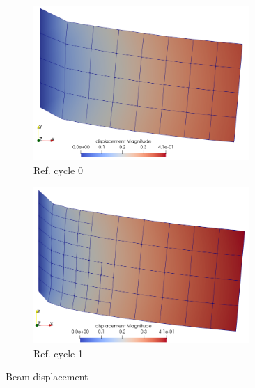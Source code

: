 \documentclass[11pt,a4paper,final]{article}
\begin{document}
\begin{figure}[h]
\centering
\begin{subfigure}[b]{0.45\textwidth}
\centering
\includegraphics[width=0.9\textwidth]{beam_ref_0_load_full.png}
\caption{Ref. cycle 0}
\label{fig:1.5.2}
\end{subfigure}
\begin{subfigure}[b]{0.45\textwidth}
\centering
\includegraphics[width=0.9\textwidth]{beam_ref_1_load_full.png}
\caption{Ref. cycle 1}
\label{fig:1.5.4}
\end{subfigure}
\caption{Beam displacement}
\label{fig:1.5}
\end{figure}
\end{document}
